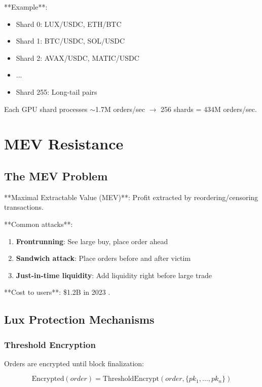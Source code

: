 \documentclass[11pt,letterpaper]{article}
\begin{document}
**Example**:
\begin{itemize}
    \item Shard 0: LUX/USDC, ETH/BTC
    \item Shard 1: BTC/USDC, SOL/USDC
    \item Shard 2: AVAX/USDC, MATIC/USDC
    \item ...
    \item Shard 255: Long-tail pairs
\end{itemize}

Each GPU shard processes $\sim$1.7M orders/sec $\to$ 256 shards = 434M orders/sec.

\section{MEV Resistance}

\subsection{The MEV Problem}

**Maximal Extractable Value (MEV)**: Profit extracted by reordering/censoring transactions.

**Common attacks**:
\begin{enumerate}
    \item \textbf{Frontrunning}: See large buy, place order ahead
    \item \textbf{Sandwich attack}: Place orders before and after victim
    \item \textbf{Just-in-time liquidity}: Add liquidity right before large trade
\end{enumerate}

**Cost to users**: \$1.2B in 2023 \cite{flashbots2024}.

\subsection{Lux Protection Mechanisms}

\subsubsection{Threshold Encryption}

Orders are encrypted until block finalization:

\begin{equation}
\text{Encrypted}(order) = \text{ThresholdEncrypt}(order, \{pk_1, \ldots, pk_n\})
\end{equation}
\end{document}
